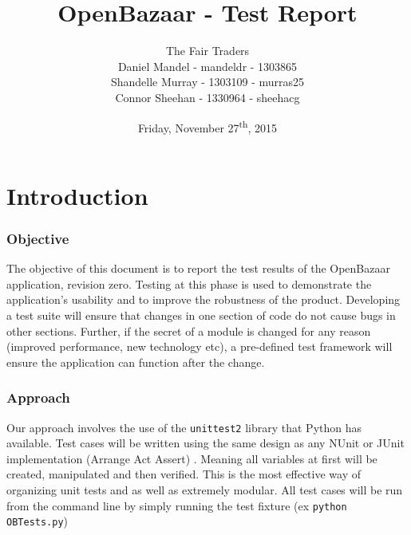 \documentclass{article}
\begin{document}
\title{OpenBazaar - Test Report}
\author{The Fair Traders\\Daniel Mandel - mandeldr - 1303865\\Shandelle Murray - 1303109 - murras25\\Connor Sheehan - 1330964 - sheehacg}
\date{Friday, November 27\textsuperscript{th}, 2015}
\maketitle


\newpage
\tableofcontents
\newpage

\part*{Introduction}
\section{Objective}
The objective of this document is to report the test results of the OpenBazaar application, revision zero. Testing at this phase is used to demonstrate the application's usability and to improve the robustness of the product. Developing a test suite will ensure that changes in one section of code do not cause bugs in other sections. Further, if the secret of a module is changed for any reason (improved performance, new technology etc), a pre-defined test framework will ensure the application can function after the change.

\section{Approach}

Our approach involves the use of the \texttt{unittest2} library that Python has available. Test cases will be written using the same design as any NUnit or JUnit implementation (Arrange Act Assert) \cite{aaa}. Meaning all variables at first will be created, manipulated and then verified. This is the most effective way of organizing unit tests and as well as extremely modular. All test cases will be run from the command line by simply running the test fixture (ex \texttt{python OBTests.py})
\end{document}
